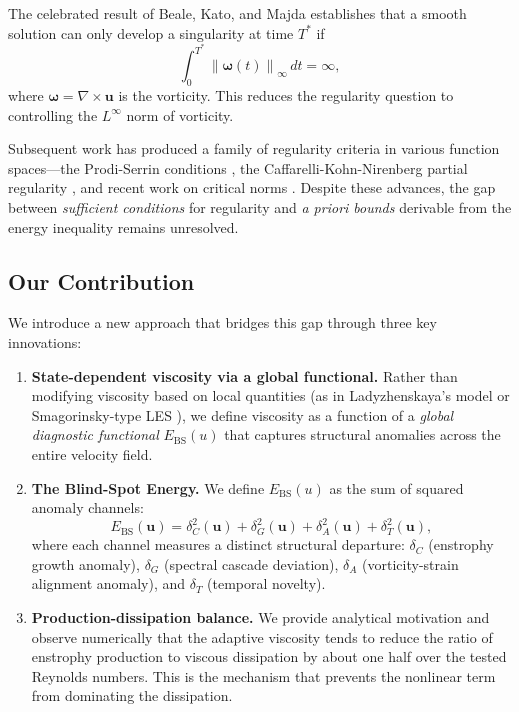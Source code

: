 \documentclass[12pt, a4paper]{article}
\newcommand{\norm}[1]{\left\| #1 \right\|}
\newcommand{\Ebs}{E_{\mathrm{BS}}}
\begin{document}
The celebrated result of Beale, Kato, and Majda \cite{bkm1984}
establishes that a smooth solution can only develop a singularity
at time $T^*$ if
\begin{equation}\label{eq:BKM}
\int_0^{T^*} \norm{\boldsymbol{\omega}(t)}_\infty \, dt = \infty,
\end{equation}
where $\boldsymbol{\omega} = \nabla \times \mathbf{u}$ is the vorticity.
This reduces the regularity question to controlling the
$L^\infty$ norm of vorticity.

Subsequent work has produced a family of regularity criteria
in various function spaces---the Prodi-Serrin conditions
\cite{prodi1959,serrin1962},
the Caffarelli-Kohn-Nirenberg partial regularity \cite{ckn1982},
and recent work on critical norms \cite{esc2003,seregin2012}.
Despite these advances, the gap between \emph{sufficient conditions}
for regularity and \emph{a priori bounds} derivable from the
energy inequality remains unresolved.

\subsection{Our Contribution}

We introduce a new approach that bridges this gap through
three key innovations:

\begin{enumerate}[label=(\roman*)]
\item \textbf{State-dependent viscosity via a global functional.}
  Rather than modifying viscosity based on local quantities
  (as in Ladyzhenskaya's model \cite{lady1969} or
  Smagorinsky-type LES \cite{smag1963}), we define viscosity
  as a function of a \emph{global diagnostic functional} $\Ebs(u)$
  that captures structural anomalies across the entire velocity field.

\item \textbf{The Blind-Spot Energy.}
  We define $\Ebs(u)$ as the sum of squared anomaly channels:
  \begin{equation}\label{eq:Ebs_def}
  \Ebs(\mathbf{u}) = \delta_C^2(\mathbf{u}) + \delta_G^2(\mathbf{u})
  + \delta_A^2(\mathbf{u}) + \delta_T^2(\mathbf{u}),
  \end{equation}
  where each channel measures a distinct structural departure:
  $\delta_C$ (enstrophy growth anomaly),
  $\delta_G$ (spectral cascade deviation),
  $\delta_A$ (vorticity-strain alignment anomaly), and
  $\delta_T$ (temporal novelty).

\item \textbf{Production-dissipation balance.}
  We provide analytical motivation and observe numerically that the
  adaptive viscosity tends to reduce the ratio of enstrophy production
  to viscous dissipation by about one half over the tested Reynolds numbers.
  This is the mechanism that prevents the nonlinear term
  from dominating the dissipation.
\end{enumerate}
\end{document}
